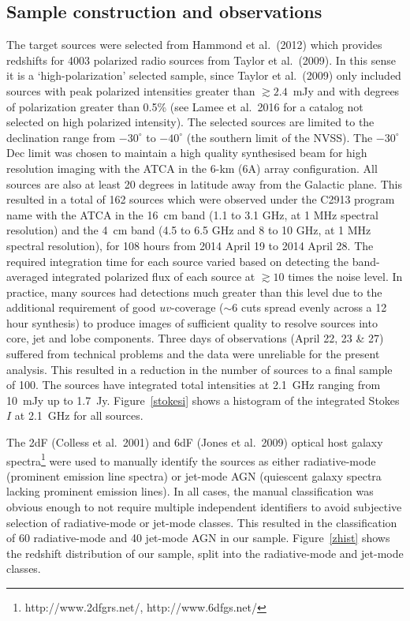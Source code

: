 \documentclass{mnras}
\begin{document}
\subsection{Sample construction and observations} \label{obs}
The target sources were selected from Hammond et al.~(2012) which provides redshifts for 4003 polarized radio sources from Taylor et al.~(2009). In this sense it is a `high-polarization' selected sample, since Taylor et al.~(2009) only included sources with peak polarized intensities greater than $\gtrsim2.4$~mJy and with degrees of polarization greater than 0.5\% (see Lamee et al.~2016 for a catalog not selected on high polarized intensity). The selected sources are limited to the declination range from $-30^\circ$ to $-40^\circ$ (the southern limit of the NVSS). The $-30^\circ$ Dec limit was chosen to maintain a high quality synthesised beam for high resolution imaging with the ATCA in the 6-km (6A) array configuration. All sources are also at least 20 degrees in latitude away from the Galactic plane. This resulted in a total of 162 sources which were observed under the C2913 program name with the ATCA in the 16~cm band (1.1 to 3.1 GHz, at 1 MHz spectral resolution) and the 4~cm band (4.5 to 6.5 GHz and 8 to 10 GHz, at 1 MHz spectral resolution), for 108 hours from 2014 April 19 to 2014 April 28. 
The required integration time for each source varied based on detecting the band-averaged integrated polarized flux of each source at $\gtrsim10$ times the noise level. In practice, many sources had detections much greater than this level due to the additional requirement of good $uv$-coverage ($\sim6$ cuts spread evenly across a 12 hour synthesis) to produce images of sufficient quality to resolve sources into core, jet and lobe components. 
Three days of observations (April 22, 23 \& 27) suffered from technical problems and the data were unreliable for the present analysis. 
This resulted in a reduction in the number of sources to a final sample of 100. The sources have integrated total intensities at 2.1~GHz ranging from 10~mJy up to 1.7~Jy. Figure~\ref{stokesi} shows a histogram of the integrated Stokes $I$ at 2.1~GHz for all sources.

The 2dF (Colless et al.~2001) and 6dF (Jones et al.~2009) optical host galaxy spectra\footnote{http://www.2dfgrs.net/, http://www.6dfgs.net/} were used to manually identify the sources as either radiative-mode (prominent emission line spectra) or jet-mode AGN (quiescent galaxy spectra lacking prominent emission lines). In all cases, the manual classification was obvious enough to not require multiple independent identifiers to avoid subjective selection of radiative-mode or jet-mode classes. This resulted in the classification of 60 radiative-mode and 40 jet-mode AGN in our sample. Figure~\ref{zhist} shows the redshift distribution of our sample, split into the radiative-mode and jet-mode classes. 
\end{document}
